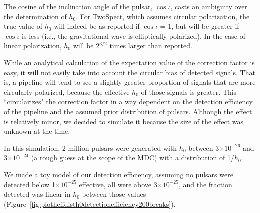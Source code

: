 The cosine of the inclination angle of the pulsar, $\cos \iota$, casts an ambiguity over the determination of $h_0$. For TwoSpect, which assumes circular polarization, the true value of $h_0$ will indeed be as reported if $\cos \iota$ = 1, but will be greater if $\cos \iota$ is less (i.e., the gravitational wave is elliptically polarized). In the case of linear polarization, $h_0$ will be $2^{3/2}$ times larger than reported.

While an analytical calculation of the expectation value of the correction factor is easy, it will not easily take into account the circular bias of detected signals. That is, a pipeline will tend to see a slightly greater proportion of signals that are more circularly polarized, because the effective $h_0$ of those signals is greater. This ``circularizes" the correction factor in a way dependent on the detection efficiency of the pipeline and the assumed prior distribution of pulsars. Although the effect is relatively minor, we decided to simulate it because the size of the effect was unknown at the time.

In this simulation, 2 million pulsars were generated with $h_0$ between 3$\times 10^{-26}$ and 3$\times 10^{-24}$ (a rough guess at the scope of the MDC) with a distribution of 1/$h_0$.

We made a toy model of our detection efficiency, assuming no pulsars were detected below 1$\times 10^{-25}$ effective, all were above 3$\times 10^{-25}$, and the fraction detected was linear in $h_0$ between those values (Figure~\ref{fig:plotheffdisth0detectionefficiency200breaks}).

